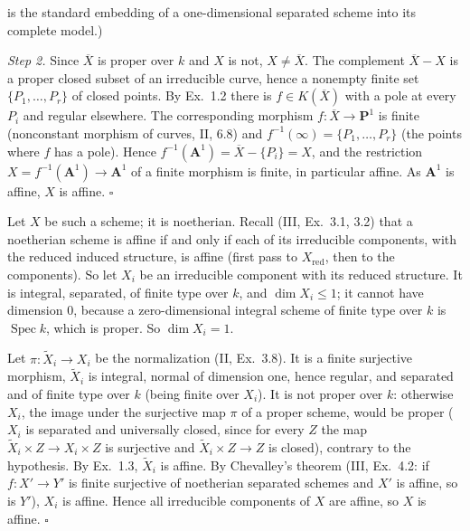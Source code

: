 \documentclass[11pt]{article}
\begin{document}
is the standard embedding of a one-dimensional separated scheme into its complete model.)

\emph{Step 2.} Since $\overline X$ is proper over $k$ and $X$ is not, $X\ne\overline X$. The complement $\overline X-X$ is a proper closed subset of an irreducible curve, hence a nonempty finite set $\{P_1,\dots,P_r\}$ of closed points. By Ex.~1.2 there is $f\in K(\overline X)$ with a pole at every $P_i$ and regular elsewhere. The corresponding morphism $f:\overline X\to\mathbf P^1$ is finite (nonconstant morphism of curves, II, 6.8) and $f^{-1}(\infty)=\{P_1,\dots,P_r\}$ (the points where $f$ has a pole). Hence $f^{-1}(\mathbf A^1)=\overline X-\{P_i\}=X$, and the restriction $X=f^{-1}(\mathbf A^1)\to\mathbf A^1$ of a finite morphism is finite, in particular affine. As $\mathbf A^1$ is affine, $X$ is affine. \hfill$\square$

\pf
Let $X$ be such a scheme; it is noetherian. Recall (III, Ex.~3.1, 3.2) that a noetherian scheme is affine if and only if each of its irreducible components, with the reduced induced structure, is affine (first pass to $X_{\mathrm{red}}$, then to the components). So let $X_i$ be an irreducible component with its reduced structure. It is integral, separated, of finite type over $k$, and $\dim X_i\le1$; it cannot have dimension $0$, because a zero-dimensional integral scheme of finite type over $k$ is $\operatorname{Spec}k$, which is proper. So $\dim X_i=1$.

Let $\pi:\widetilde X_i\to X_i$ be the normalization (II, Ex.~3.8). It is a finite surjective morphism, $\widetilde X_i$ is integral, normal of dimension one, hence regular, and separated and of finite type over $k$ (being finite over $X_i$). It is not proper over $k$: otherwise $X_i$, the image under the surjective map $\pi$ of a proper scheme, would be proper ($X_i$ is separated and universally closed, since for every $Z$ the map $\widetilde X_i\times Z\to X_i\times Z$ is surjective and $\widetilde X_i\times Z\to Z$ is closed), contrary to the hypothesis. By Ex.~1.3, $\widetilde X_i$ is affine. By Chevalley's theorem (III, Ex.~4.2: if $f:X'\to Y'$ is finite surjective of noetherian separated schemes and $X'$ is affine, so is $Y'$), $X_i$ is affine. Hence all irreducible components of $X$ are affine, so $X$ is affine. \hfill$\square$
\end{document}
